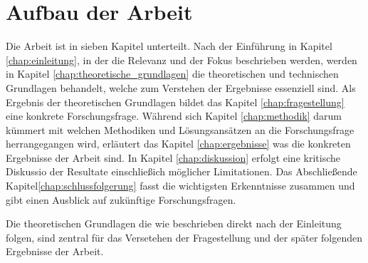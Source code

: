 \section{Aufbau der Arbeit}
\label{sec:aufbau_der_arbeit} Die Arbeit ist in sieben Kapitel unterteilt. Nach der
Einführung in Kapitel \ref{chap:einleitung}, in der die Relevanz und der Fokus
beschrieben werden, werden in Kapitel \ref{chap:theoretische_grundlagen} die theoretischen
und technischen Grundlagen behandelt, welche zum Verstehen der Ergebnisse
essenziell sind. Als Ergebnis der theoretischen Grundlagen bildet das Kapitel \ref{chap:fragestellung}
eine konkrete Forschungsfrage. Während sich Kapitel \ref{chap:methodik} darum
kümmert mit welchen Methodiken und Lösungsansätzen an die Forschungsfrage
herrangegangen wird, erläutert das Kapitel \ref{chap:ergebnisse} was die konkreten
Ergebnisse der Arbeit sind. In Kapitel \ref{chap:diskussion} erfolgt eine
kritische Diskussio der Resultate einschließich möglicher Limitationen. Das Abschließende
Kapitel\ref{chap:schlussfolgerung} fasst die wichtigsten Erkenntnisse zusammen
und gibt einen Ausblick auf zukünftige Forschungsfragen.

Die theoretischen Grundlagen die wie beschrieben direkt nach der Einleitung
folgen, sind zentral für das Versetehen der Fragestellung und der später folgenden
Ergebnisse der Arbeit.
